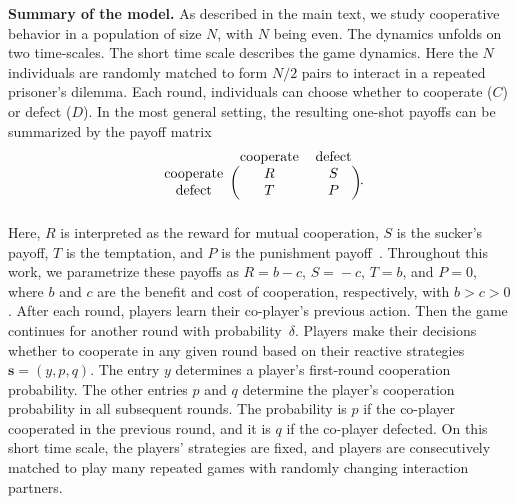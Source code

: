 \documentclass[11pt]{article}
\theoremstyle{plainCl1}
\theoremstyle{plainCl2}
\begin{document}
\noindent
{\bf Summary of the model.} As described in the main text, we study cooperative behavior in a population of size $N$, with $N$ being even.
The dynamics unfolds on two time-scales. 
The short time scale describes the game dynamics. 
Here the $N$ individuals are randomly matched to form $N/2$ pairs to interact in a repeated prisoner's dilemma.  
Each round, individuals can choose whether to cooperate ($C$) or defect ($D$). 
In the most general setting, the resulting one-shot payoffs can be summarized by the payoff matrix 
\begin{equation}\label{eq:prisoner}
    \begin{blockarray}{ccc}
        & \text{cooperate} & \text{defect} \\
        \begin{block}{c(cc)}
            \text{cooperate} & R & S \\
            \text{defect} & T & P \\
        \end{block}
    \end{blockarray}.
\end{equation}
Here, $R$ is interpreted as the reward for mutual cooperation, $S$ is the sucker's payoff, $T$ is the temptation, and $P$ is the punishment payoff~\citep{axelrod1981evolution}. 
Throughout this work, we parametrize these payoffs as $R\!=\!b\!-\!c$, $S\!=\!-c$, $T\!=\!b$, and $P\!=\!0$, where $b$ and $c$ are the benefit and cost of cooperation, respectively, with $b\!>\!c\!>0$. 
After each round, players learn their co-player's previous action. 
Then the game continues for another round with probability~$\delta$.
Players make their decisions whether to cooperate in any given round based on their reactive strategies $\mathbf{s}\!=\!(y,p,q)$. 
The entry $y$ determines a player's first-round cooperation probability. 
The other entries $p$ and $q$ determine the player's cooperation probability in all subsequent rounds. 
The probability is $p$ if the co-player cooperated in the previous round, and it is $q$ if the co-player defected. 
On this short time scale, the players' strategies are fixed, and players are consecutively matched to play many repeated games with randomly changing interaction partners. 

\end{document}
